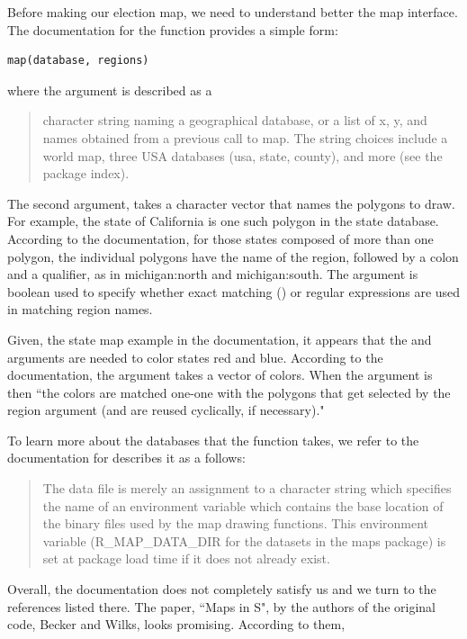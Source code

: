 Before making our election map, we need to understand better the map interface.
The documentation for the  function provides 
a simple form: 
\begin{verbatim}map(database, regions)
\end{verbatim} 
where the argument  is described as a
\begin{quote}
character string naming a geographical database, or a list of x, y, and names obtained
from a previous call to map. The string choices include a world map, three 
USA databases (usa, state, county), and more (see the package index). 
\end{quote}
The second argument,  takes a character vector that names the polygons 
to draw. For example, the state of California is one such polygon in the 
state database.  According to the documentation, for those states 
composed of more than one polygon, 
the individual polygons have the name of the region, 
followed by a colon and a qualifier, as in michigan:north and michigan:south. 
The  argument is boolean used to specify whether exact matching
(\STrue) or regular expressions are used in matching region names.

Given, the state map example in the documentation, it appears that the 
 and  arguments are needed to color states red and blue. 
According to the documentation, the  argument takes a vector of colors. 
When the  argument is \STrue then 
``the colors are matched one-one with the polygons that get selected by the 
region argument (and are reused cyclically, if necessary)." 

To learn more about the databases that the function takes, we refer to
the documentation for  describes it as a follows:
\begin{quote} 
The data file is merely an assignment to a character string which specifies 
the name of an environment variable which contains the base location of the 
binary files used by the map drawing functions. 
This environment variable (R\_MAP\_DATA\_DIR for the datasets in the maps package) 
is set at package load time if it does not already exist. 
\end{quote}

Overall, the documentation does not completely satisfy us and we turn to
the references listed there.
The paper, ``Maps in S", by the authors of the 
original code, Becker and Wilks, looks promising.
According to them,

